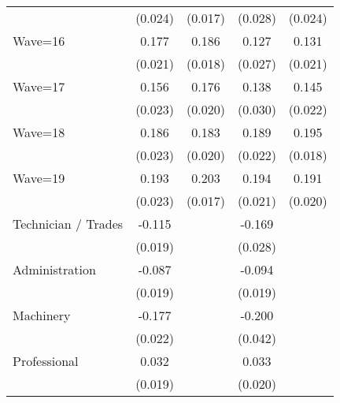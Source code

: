 {\begin{tabular}{l*{4}{c}}
                    &     (0.024)         &     (0.017)         &     (0.028)         &     (0.024)         \\
[1em]
Wave=16             &       0.177\sym{***}&       0.186\sym{***}&       0.127\sym{***}&       0.131\sym{***}\\
                    &     (0.021)         &     (0.018)         &     (0.027)         &     (0.021)         \\
[1em]
Wave=17             &       0.156\sym{***}&       0.176\sym{***}&       0.138\sym{***}&       0.145\sym{***}\\
                    &     (0.023)         &     (0.020)         &     (0.030)         &     (0.022)         \\
[1em]
Wave=18             &       0.186\sym{***}&       0.183\sym{***}&       0.189\sym{***}&       0.195\sym{***}\\
                    &     (0.023)         &     (0.020)         &     (0.022)         &     (0.018)         \\
[1em]
Wave=19             &       0.193\sym{***}&       0.203\sym{***}&       0.194\sym{***}&       0.191\sym{***}\\
                    &     (0.023)         &     (0.017)         &     (0.021)         &     (0.020)         \\
[1em]
Technician / Trades &      -0.115\sym{***}&                     &      -0.169\sym{***}&                     \\
                    &     (0.019)         &                     &     (0.028)         &                     \\
[1em]
Administration      &      -0.087\sym{***}&                     &      -0.094\sym{***}&                     \\
                    &     (0.019)         &                     &     (0.019)         &                     \\
[1em]
Machinery           &      -0.177\sym{***}&                     &      -0.200\sym{***}&                     \\
                    &     (0.022)         &                     &     (0.042)         &                     \\
[1em]
Professional        &       0.032         &                     &       0.033         &                     \\
                    &     (0.019)         &                     &     (0.020)         &                     \\

\end{tabular}}
